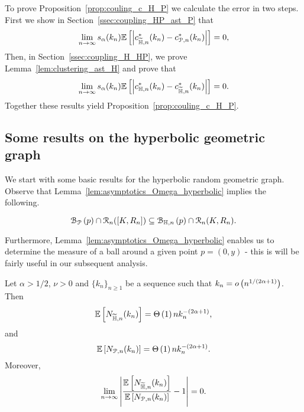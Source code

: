 To prove Proposition~\ref{prop:couling_c_H_P} we calculate the error in two steps. First we show in Section~\ref{ssec:coupling_HP_ast_P} that
\[
	\lim_{n \to \infty} s_\alpha(k_n) \mathbb{E}\left[\left|c_{\widetilde{\mathbb{H}},n}^\ast(k_n) - c_{{\mathcal P},n}^\ast(k_n)\right|\right] = 0,
\]
Then, in Section~\ref{ssec:coupling_H_HP}, we prove Lemma~\ref{lem:clustering_ast_H} and prove that
\[
	\lim_{n \to \infty} s_\alpha(k_n) \mathbb{E}\left[\left| c_{\mathbb{H},n}^\ast(k_n) - c_{\widetilde{\mathbb{H}},n}^\ast(k_n)\right|\right] = 0.
\]
Together these results yield Proposition~\ref{prop:couling_c_H_P}.

\subsection{Some results on the hyperbolic geometric graph}

We start with some basic results for the hyperbolic random geometric graph. Observe that Lemma~\ref{lem:asymptotics_Omega_hyperbolic} implies the following. 
\begin{corollary}\label{cor:balls_inclusion}
\begin{equation*}
 {\mathcal B}_{{\mathcal P}}\left(p\right) \cap {\mathcal R}_n ([K,R_n]) \subseteq {\mathcal B}_{\mathbb{H},n}\left(p\right) \cap {\mathcal R}_n (K,R_n). 
\end{equation*}
\end{corollary}


Furthermore, Lemma~\ref{lem:asymptotics_Omega_hyperbolic} enables us to determine the measure of a ball around a given point $p=(0,y)$ - this is will be fairly useful in our subsequent analysis. 

\begin{lemma}
Let $\alpha > 1/2$, $\nu > 0$ and $\{k_n\}_{n\ge 1}$ be a sequence such that $k_n = o\left(n^{1/(2\alpha + 1)}\right)$. Then
\begin{equation} \label{eq:n_k_Hyp}
	\mathbb{E}\left[N_{\widetilde{\mathbb{H}},n}(k_n)\right] = \Theta\left(1\right) n k_n^{-(2\alpha + 1)},
\end{equation}
and
\begin{equation} \label{eq:n_k_Po}
	\mathbb{E}\left[N_{{\mathcal P},n}(k_n)\right] = \Theta\left(1\right) n k_n^{-(2\alpha + 1)}.
\end{equation}
Moreover,
\begin{equation}\label{eq:equivalence_N_HP_P}
	\lim_{n \to \infty} \left|\frac{\mathbb{E}\left[N_{\widetilde{\mathbb{H}},n}(k_n)\right]}{\mathbb{E}\left[N_{{\mathcal P},n}(k_n)\right]} - 1\right| = 0.
\end{equation}
\end{lemma}

